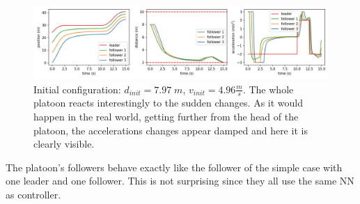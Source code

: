 \begin{figure}[H]
	\centering
	\includegraphics[width=13.8cm, keepaspectratio]{img/5_3_triplot_fullplatooning_pulse.png}
	\caption{Initial configuration: $d_{init}= 7.97\; m$, $v_{init}=4.96 \frac{m}{s}$. The whole platoon reacts interestingly to the sudden changes. As it would happen in the real world, getting further from the head of the platoon, the accelerations changes appear damped and here it is clearly visible.}
    \label{fig:multi_triplot_pulse}
\end{figure}
The platoon's followers behave exactly like the follower of the simple case with one leader and one follower.
This is not surprising since they all use the same NN as controller.
